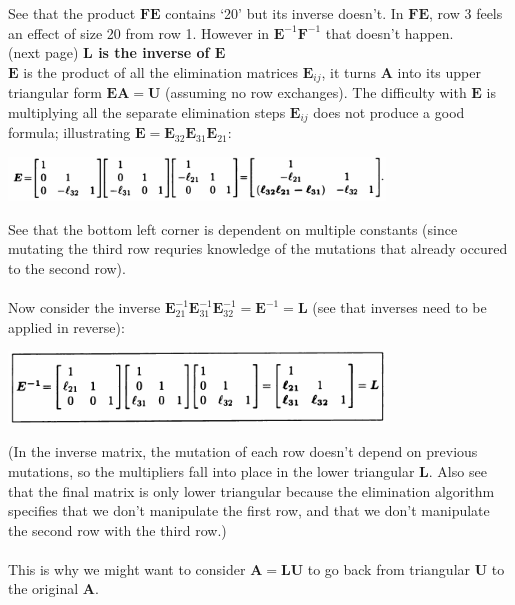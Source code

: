 \documentclass{report}
\begin{document}
See that the product $\bm{FE}$ contains `20' but its inverse doesn't. In $\bm{FE}$, row 3 feels an effect of size 20 from row 1. However in $\bm E^{-1}\bm F^{-1}$ 
that doesn't happen.\\
(next page)\newpage
\noindent\textbf{$\bm L$ is the inverse of $\bm E$}\\
$\bm E$ is the product of all the elimination matrices $\bm E_{ij}$, it turns $\bm A$ into its upper triangular form $\bm{EA}=\bm U$ (assuming no row exchanges). 
The difficulty with $\bm E$ is multiplying all the separate elimination steps $\bm E_{ij}$ does not produce a good formula; illustrating 
$\bm E=\bm E_{32}\bm E_{31}\bm E_{21}$:
\begin{center}
\includegraphics[width=10cm]{5}
\end{center}
See that the bottom left corner is dependent on multiple constants (since mutating the third row requries knowledge of the mutations that already occured to the
second row).\\
\vspace{1mm}\\
Now consider the inverse $\bm E^{-1}_{21}\bm E^{-1}_{31}\bm E^{-1}_{32}=\bm E^{-1}=\bm L$ (see that inverses need to be applied in reverse):
\begin{center}
\includegraphics[width=10cm]{6}
\end{center}
(In the inverse matrix, the mutation of each row doesn't depend on previous mutations, so the multipliers fall into place in the lower triangular $\bm L$. 
Also see that the final matrix is only lower triangular because the elimination algorithm specifies that we don't manipulate the first row, and that we don't
manipulate the second row with the third row.)\\
\vspace{1mm}\\
This is why we might want to consider $\bm A=\bm{LU}$ to go back from triangular $\bm U$ to the original $\bm A$.
\newpage
\end{document}
